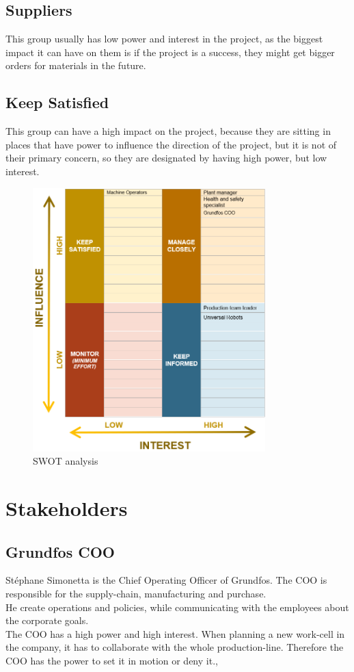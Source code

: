 \subsection{Suppliers}
This group usually has low power and interest in the project, as the biggest impact it can have on them is if the project is a success, they might get bigger orders for materials in the future.\\

\subsection{Keep Satisfied}
This group can have a high impact on the project, because they are sitting in places that have power to influence the direction of the project, but it is not of their primary concern, so they are designated by having high power, but low interest.\\

\begin{figure}[h]
    \centering
    \includegraphics[width=9cm]{StakeholderAnalysis/SWOT.PNG}
    \caption{SWOT analysis}
    \label{fig:SWOT analysis}
\end{figure}


\section{Stakeholders}


\subsection{Grundfos COO}\label{ch:grundfosas-CEO}
Stéphane Simonetta is the Chief Operating Officer of Grundfos. The COO is responsible for the supply-chain, manufacturing and purchase.\\ 
He create operations and policies, while communicating with the employees about the corporate goals.\\
The COO has a high power and high interest. When planning a new work-cell in the company, it has to collaborate with the whole production-line. Therefore the COO has the power to set it in motion or deny it.\cite{Grundfos},\cite{COO}\\

